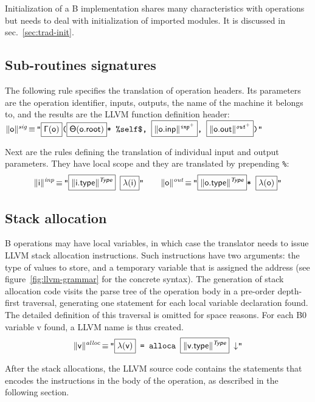 \documentclass{llncs}
\newcommand{\trad}[2]{\ensuremath{\lVert \textsf{#1} \rVert^{\textit{#2}}}}
\newcommand{\nl}[0]{\ensuremath{\downarrow}}
\DeclareMathOperator{\isdef}{\equiv}
\newcommand{\llvm}[1]{\texttt{#1}}
\newcommand{\B}[1]{\textsf{#1}}
\newcommand{\ListOf}[1]{$\mbox{#1}^+$}
\newcommand{\PH}[1]{\framebox{$#1$}}
\newcommand{\Global}[0]{\ensuremath{\sf\Gamma}}
\newcommand{\local}[0]{\ensuremath{\sf\lambda}}
\newcommand{\state}[0]{\ensuremath{\sf\Theta}}
\begin{document}
Initialization of a B implementation shares many characteristics with operations
but needs to deal with initialization of imported modules. It is discussed in
sec.~\ref{sec:trad-init}.

\subsection{Sub-routines signatures}
\label{sec:trad-header}

The following rule specifies the translation of operation headers. Its
parameters are the operation identifier, inputs, outputs, the name of the
machine it belongs to, and the results are the LLVM function definition
header: \\
\noindent$\trad{\B{o}}{sig} \isdef \llvm{"\PH{\Global(\B{o})}(\PH{\state(\B{o.root})}* \%self\$, \PH{\trad{\B{o.inp}}{\ListOf{inp}}}, \PH{\trad{\B{o.out}}{\ListOf{out}}})"}$

Next are the rules defining the translation of individual input and output
parameters. They have local scope and they are translated by prepending
\llvm{\%}:
\begin{align*}
  \trad{i}{inp} \isdef 
  \llvm{"\PH{\trad{i.type}{\B{Type}}} \PH{\local(\B{i})}"} \quad \quad
  \trad{o}{out} \isdef 
  \llvm{"\PH{\trad{o.type}{\B{Type}}}* \PH{\local(\B{o})}"}
\end{align*}

\subsection{Stack allocation}
\label{sec:trad-alloc}

B operations may have local variables, in which case the translator needs to
issue LLVM stack allocation instructions. Such instructions have two arguments:
the type of values to store, and a temporary variable that is assigned the
address (see figure~\ref{fig:llvm-grammar} for the concrete syntax). The
generation of stack allocation code visits the parse tree of the operation body
in a pre-order depth-first traversal, generating one statement for each local
variable declaration found. The detailed definition of this traversal is omitted
for space reasons. For each B0 variable \B{v} found, a LLVM name is thus
created.
\begin{align*}
  \trad{v}{alloc} \isdef 
  \llvm{"\PH{\local(\B{v})} = alloca \PH{\trad{v.type}{\B{Type}}} \nl"}
\end{align*}

After the stack allocations, the LLVM source code contains the statements that
encodes the instructions in the body of the operation, as described in the
following section.
\end{document}
